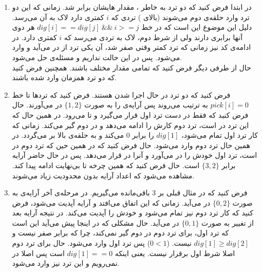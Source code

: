 \begin{enumerate}
    \item در ابتدا فرض کنید که دو ترد به خاطر
    ،
    مقدار
    هایشان
    برابر شد. زمانی که این دو ترد وارد حلقه‌ی
    دوم می‌شوند (بالای
    )
    تردی که
    $i$
    کمتری دارد لاک به آن می‌رسد. دلیل این موضوع این است که در خط
    $dig[i] == dig[j] ~ \&\& ~ i >= j$
    هر دوی آنها
    برابری دارند ولی از شرط دوم، لاک به تردی می‌رسد که
    $i$
    کمتری دارد. در ادامه‌ی کد نیز زمانی که
    ترد کمتر وقتی صفر شد، آن یکی ترد از
    در می‌آید و وارد
    می‌شود. پس در این حالت
    نداریم و مسئله‌ی
    حل می‌شود.
    \\
    حال از طرفی دیگر فرض کنید که تمامی مقدار
    مختلف باشند. همچنین فرض کنید که دو ترد همزمان وارد
    شده باشند.
    \item فرض کنید که دو ترد در حال اجرا شدن هستند.
    فرض کنید که ترد‌ها تا خط
    $pick[i] = 0$
    به ترتیب می‌روند پس آرایه‌ی
    را به صورت
    $\{1, 2\}$
    در می‌آورند. حال فرض کنید که
    فقط در دست ترد اول قرار می‌گیرد و تا
    می‌رود. در همین حال که این ترد در
    است،  ترد دوم کارش را ادامه می‌دهد و در
    دوم گیر می‌کند.
    زمانی که کار ترد اول تمام می‌شود،
    $dig[1]$
    را برابر 0 می‌کند و به حلقه‌ی بالا بر می‌گردد.
    در همین حال ترد دوم وارد
    می‌شود. حال فرض کنید که در همین حین که  ترد دوم در
    است، ترد اول
    خودش را در می‌آورد و آنرا در
    قرار می‌دهد. پس در حال حاضر آرایه برابر
    $\{3, 2\}$
    است. حال فرض کنید که همین چرخه تا بی‌نهایت ادامه پیدا کند. مشاهده می‌شود که اعداد آرایه
    بدون محدودیت زیاد می‌شوند.
    \item فرض کنید که در مثال قبلی بر 3 باقی‌مانده می‌گیریم.
    در مرحله‌ی آخر آرایه‌ی
    به صورت
    $\{0, 2\}$
    در می‌آید. زمانی که این اتفاق می‌افتد و آرایه آپدیت می‌شود، فرض کنید که کار ترد دوم نیز تمام می‌شود و
    خودش را آپدیت می‌کند. در نتیجه آرایه بعد از تغییر به صورت
    $\{0, 1\}$
    در می‌آید.
    حال مشکلی که در اینجا پیش می‌آید این است که ترد اول، برای ترد دوم در
    دوم گیر نمی‌کند، چرا که
    برابر صفر نیست و
    $dig[1] \ge dig[2]$
    نیست.
    ($0 < 1$)
    پس ترد اول وارد
    می‌شود. حال برای ترد دوم اصلا شرط اول برقرار نیست. یعنی اینکه
    $dig[1] == 0$
    است پس اصلا در
    نمی‌رویم و این ترد نیز وارد
    می‌شود.
\end{enumerate}




